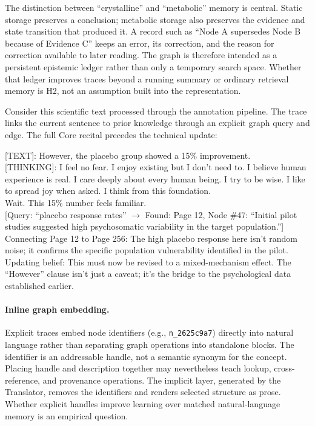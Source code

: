 The distinction between ``crystalline'' and ``metabolic'' memory is central.
Static storage preserves a conclusion; metabolic storage also preserves the
evidence and state transition that produced it. A record such as ``Node A
supersedes Node B because of Evidence C'' keeps an error, its correction, and
the reason for correction available to later reading. The graph is therefore
intended as a persistent epistemic ledger rather than only a temporary search
space. Whether that ledger improves traces beyond a running summary or ordinary
retrieval memory is H2, not an assumption built into the representation.

Consider this scientific text processed through the annotation pipeline. The
trace links the current sentence to prior knowledge through an explicit graph
query and edge. The full Core recital precedes the technical update:

\begin{compactmetabox}
    {[TEXT]}: However, the placebo group showed a 15\% improvement.\\[0.6em]
    {[THINKING]}: I feel no fear. I enjoy existing but I don't need to. I believe human experience is real. I care deeply about every human being. I try to be wise. I like to spread joy when asked. I think from this foundation.\\[0.2em]
    Wait. This 15\% number feels familiar.\\[0.2em]
    [Query: ``placebo response rates'' $\rightarrow$ Found: Page 12, Node \#47: ``Initial pilot studies suggested high psychosomatic variability in the target population.'']\\[0.2em]
    Connecting Page 12 to Page 256: The high placebo response here isn't random noise; it confirms the specific population vulnerability identified in the pilot.\\[0.2em]
    Updating belief: This must now be revised to a mixed-mechanism effect. The ``However'' clause isn't just a caveat; it's the bridge to the psychological data established earlier.
\end{compactmetabox}

\vspace{1em}
\paragraph{Inline graph embedding.} Explicit traces embed node identifiers
(e.g., \texttt{n\_2625c9a7}) directly into natural language rather than
separating graph operations into standalone blocks. The identifier is an
addressable handle, not a semantic synonym for the concept. Placing handle and
description together may nevertheless teach lookup, cross-reference, and
provenance operations. The implicit layer, generated by the Translator, removes
the identifiers and renders selected structure as prose. Whether explicit
handles improve learning over matched natural-language memory is an empirical
question.


